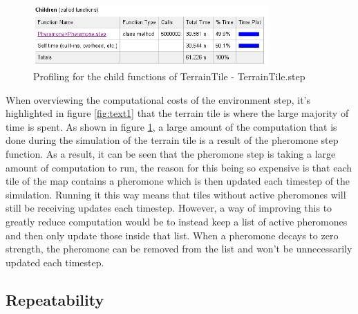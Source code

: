  \begin{figure}[htb]
  \centering
  \includegraphics[width=0.8\textwidth]{images/text2.png}
  \caption{Profiling for the child functions of TerrainTile - TerrainTile.step}
  \label{fig:text2}
\end{figure}

When overviewing the computational costs of the environment step, it's highlighted in figure \ref{fig:text1} that the terrain tile is where the large majority of time is spent. As shown in figure \ref{fig:text2}, a large amount of the computation that is done during the simulation of the terrain tile is a result of the pheromone step function. As a result, it can be seen that the pheromone step is taking a large amount of computation to run, the reason for this being so expensive is that each tile of the map contains a pheromone which is then updated each timestep of the simulation. Running it this way means that tiles without active pheromones will still be receiving updates each timestep. However, a way of improving this to greatly reduce computation would be to instead keep a list of active pheromones and then only update those inside that list. When a pheromone decays to zero strength, the pheromone can be removed from the list and won't be unnecessarily updated each timestep.\par

\subsection{Repeatability}
